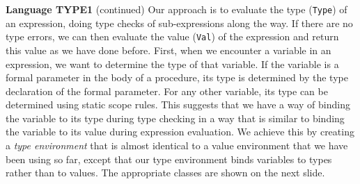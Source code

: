 \begin{minipage}[t]{\sw}
\slidenumber
\LARGE
{\bf Language TYPE1} (continued)\exx
Our approach is to evaluate the type (\verb'Type') of an expression,
doing type checks of sub-expressions along the way.
If there are no type errors,
we can then evaluate the value (\verb'Val') of the expression
and return this value as we have done before.\exx
First, when we encounter a variable in an expression,
we want to determine the type of that variable.
If the variable is a formal parameter in the body of a procedure,
its type is determined by the type declaration of the formal parameter.
For any other variable,
its type can be determined using static scope rules.
This suggests that we have a way of binding the variable to its type
during type checking
in a way that is similar to binding the variable to its value
during expression evaluation.
We achieve this by creating a {\em type environment}
that is almost identical to a value environment
that we have been using so far,
except that our type environment binds variables
to types rather than to values.\exx
The appropriate classes are shown on the next slide.
\end{minipage}
